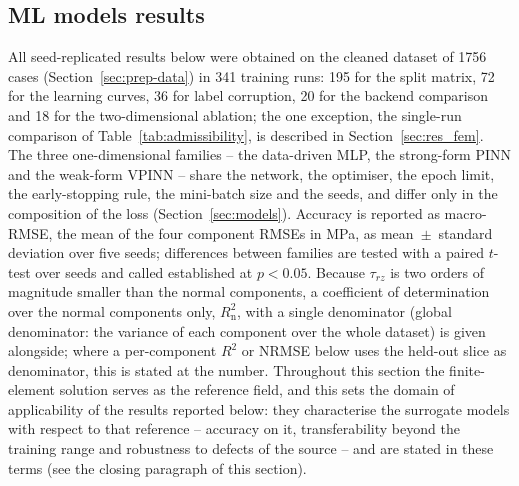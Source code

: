 \documentclass[subscriptcorrection,upint,varvw,barcolor=Goldenrod3,mathalfa=cal=euler,balance,hyphenate,french,pdf-a]{asmejour} %
\begin{document}
\subsection{ML models results}
\label{sec:results}

All seed-replicated results below were obtained on the cleaned dataset of 1756 cases (Section~\ref{sec:prep-data}) in 341 training runs: 195 for the split matrix, 72 for the learning curves, 36 for label corruption, 20 for the backend comparison and 18 for the two-dimensional ablation; the one exception, the single-run comparison of Table~\ref{tab:admissibility}, is described in Section~\ref{sec:res_fem}. %
The three one-dimensional families -- the data-driven MLP, the strong-form PINN and the weak-form VPINN -- share the network, the optimiser, the epoch limit, the early-stopping rule, the mini-batch size and the seeds, and differ only in the composition of the loss (Section~\ref{sec:models}). Accuracy is reported as macro-RMSE, the mean of the four component RMSEs in MPa, as mean~$\pm$~standard deviation over five seeds; differences between families are tested with a paired $t$-test over seeds \citep{demsar2006} and called established at $p<0.05$. Because $\tau_{rz}$ is two orders of magnitude smaller than the normal components, a coefficient of determination over the normal components only, $R^2_{\mathrm{n}}$, with a single denominator (global denominator: the variance of each component over the whole dataset) is given alongside; where a per-component $R^2$ or NRMSE below uses the held-out slice as denominator, this is stated at the number. %
Throughout this section the finite-element solution serves as the reference field, and this sets the domain of applicability of the results reported below: they characterise the surrogate models with respect to that reference -- accuracy on it, transferability beyond the training range and robustness to defects of the source -- and are stated in these terms (see the closing paragraph of this section). %
\end{document}
